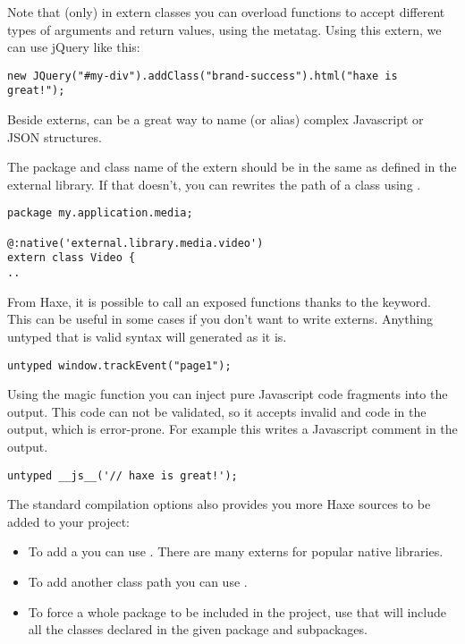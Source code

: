 Note that (only) in extern classes you can overload functions to accept different types of arguments and return values, using the  metatag.
Using this extern, we can use jQuery like this:

\begin{lstlisting}
new JQuery("#my-div").addClass("brand-success").html("haxe is great!");
\end{lstlisting}

Beside externs,  can be a great way to name (or alias) complex Javascript or JSON structures.

The package and class name of the extern should be in the same as defined in the external library. If that doesn't, you can rewrites the path of a class using .

\begin{lstlisting}
package my.application.media;

@:native('external.library.media.video')
extern class Video {
..
\end{lstlisting}

From Haxe, it is possible to call an exposed functions thanks to the  keyword. This can be useful in some cases if you don't want to write externs. Anything untyped that is valid syntax will generated as it is.

\begin{lstlisting}
untyped window.trackEvent("page1");  
\end{lstlisting}

Using the magic  function you can inject pure Javascript code fragments into the output. This code can not be validated, so it accepts invalid and code in the output, which is error-prone.
For example this writes a Javascript comment in the output.

\begin{lstlisting}
untyped __js__('// haxe is great!');
\end{lstlisting}

The standard compilation options also provides you more Haxe sources to be added to your project:

\begin{itemize}
	\item To add a  you can use . There are many externs for popular native libraries.
	\item To add another class path you can use .
	\item To force a whole package to be included in the project, use  that will include all the classes declared in the given package and subpackages. 
\end{itemize}


